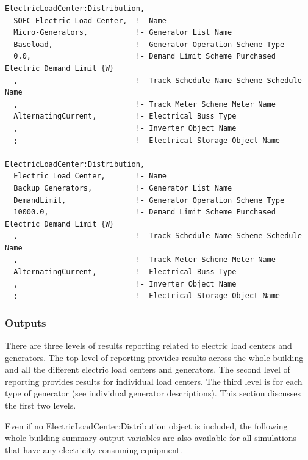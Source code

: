 \begin{lstlisting}
ElectricLoadCenter:Distribution,
  SOFC Electric Load Center,  !- Name
  Micro-Generators,           !- Generator List Name
  Baseload,                   !- Generator Operation Scheme Type
  0.0,                        !- Demand Limit Scheme Purchased Electric Demand Limit {W}
  ,                           !- Track Schedule Name Scheme Schedule Name
  ,                           !- Track Meter Scheme Meter Name
  AlternatingCurrent,         !- Electrical Buss Type
  ,                           !- Inverter Object Name
  ;                           !- Electrical Storage Object Name

ElectricLoadCenter:Distribution,
  Electric Load Center,       !- Name
  Backup Generators,          !- Generator List Name
  DemandLimit,                !- Generator Operation Scheme Type
  10000.0,                    !- Demand Limit Scheme Purchased Electric Demand Limit {W}
  ,                           !- Track Schedule Name Scheme Schedule Name
  ,                           !- Track Meter Scheme Meter Name
  AlternatingCurrent,         !- Electrical Buss Type
  ,                           !- Inverter Object Name
  ;                           !- Electrical Storage Object Name
\end{lstlisting}

\subsubsection{Outputs}\label{outputs-1-008}

There are three levels of results reporting related to electric load centers and generators. The top level of reporting provides results across the whole building and all the different electric load centers and generators. The second level of reporting provides results for individual load centers. The third level is for each type of generator (see individual generator descriptions). This section discusses the first two levels.

Even if no ElectricLoadCenter:Distribution object is included, the following whole-building summary output variables are also available for all simulations that have any electricity consuming equipment.


